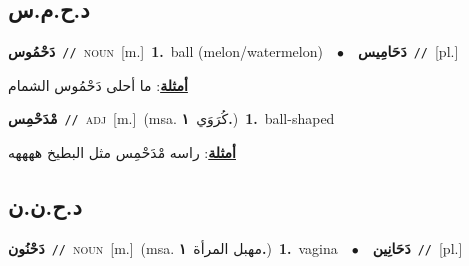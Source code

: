 \documentclass[10pt,a4paper,twoside]{article} %
\begin{document}
\begin{multicols}{2}
\vspace{-3mm}
\subsection*{\color{blue}\foreignlanguage{arabic}{د.ح.م.س}\color{blue}{}} 

{\setlength\topsep{0pt}\textbf{\foreignlanguage{arabic}{دَحْمُوس}}\ {\color{gray}\texttt{//}\color{black}}\ \textsc{noun}\ [m.]\ \textbf{1.}~ball (melon/watermelon)\ \ $\bullet$\ \ \setlength\topsep{0pt}\textbf{\foreignlanguage{arabic}{دَحَامِيس}}\ {\color{gray}\texttt{//}\color{black}}\ [pl.]\  \begin{flushright}\color{gray}\foreignlanguage{arabic}{\textbf{\underline{\foreignlanguage{arabic}{أمثلة}}}: ما أحلى دَحْمُوس الشمام}\end{flushright}\color{black}} \vspace{2mm}

{\setlength\topsep{0pt}\textbf{\foreignlanguage{arabic}{مْدَحْمِس}}\ {\color{gray}\texttt{//}\color{black}}\ \textsc{adj}\ [m.]\ \color{gray}(msa. \foreignlanguage{arabic}{كُرَوَي}~\foreignlanguage{arabic}{\textbf{١.}})\color{black}\ \textbf{1.}~ball-shaped\  \begin{flushright}\color{gray}\foreignlanguage{arabic}{\textbf{\underline{\foreignlanguage{arabic}{أمثلة}}}: راسه مْدَحْمِس مثل البطيخ ههههه}\end{flushright}\color{black}} \vspace{2mm}

\vspace{-3mm}
\subsection*{\color{blue}\foreignlanguage{arabic}{د.ح.ن.ن}\color{blue}{}} 

{\setlength\topsep{0pt}\textbf{\foreignlanguage{arabic}{دَحْنُون}}\ {\color{gray}\texttt{//}\color{black}}\ \textsc{noun}\ [m.]\ \color{gray}(msa. \foreignlanguage{arabic}{مهبل المرأة}~\foreignlanguage{arabic}{\textbf{١.}})\color{black}\ \textbf{1.}~vagina\ \ $\bullet$\ \ \setlength\topsep{0pt}\textbf{\foreignlanguage{arabic}{دَحَانِين}}\ {\color{gray}\texttt{//}\color{black}}\ [pl.]\ } \vspace{2mm}


\end{multicols}
\end{document}
